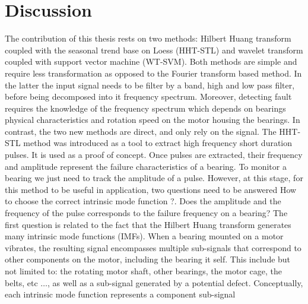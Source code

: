 \documentclass[thesis.tex]{subfiles}
\begin{document}
	\section{Discussion}
	\label{sec:discussion}
	The contribution of this thesis rests on two methods: Hilbert Huang transform coupled with the seasonal trend base on Loess (HHT-STL) and wavelet transform coupled with support vector machine (WT-SVM). Both methods are simple and require less transformation as opposed to the Fourier transform based method. In the latter the input signal needs to be filter by a band, high and low pass filter, before being decomposed into it frequency spectrum. Moreover, detecting fault requires the knowledge of the frequency spectrum which depends on bearings physical characteristics and rotation speed on the motor housing the bearings. In contrast, the two new methods are direct, and only rely on the signal.
	\justify
	The HHT-STL method was introduced as a tool to extract high frequency short duration pulses. It is used as a proof of concept. Once pulses are extracted, their frequency and amplitude represent the failure characteristics of a bearing. To monitor a bearing we just need to track the amplitude of a pulse. However, at this stage, for this method to be useful in application, two questions need to be answered 
	\justify
	How to choose the correct intrinsic mode function ?. Does the amplitude and the frequency of the pulse corresponds to the failure frequency on a bearing? 
	The first question is related to the fact that the Hilbert Huang transform generates many intrinsic mode functions (IMFs). When a bearing mounted on a motor vibrates, the resulting signal encompasses multiple sub-signals that correspond to other components on the motor, including the bearing it self. This include but not limited to: the rotating motor shaft, other bearings, the motor cage, the belts, etc $\dots$, as well as a sub-signal generated by a potential defect. Conceptually, each intrinsic mode function represents a component sub-signal
\end{document}

